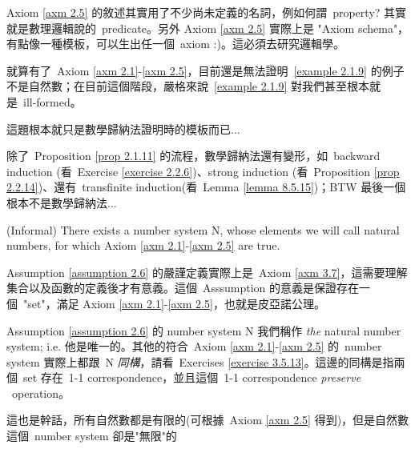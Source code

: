 \begin{remark}\label{rmk 2.1.10} Axiom \ref{axm 2.5} 的敘述其實用了不少尚未定義的名詞，例如何謂\ property? 其實就是數理邏輯說的\ predicate。另外 Axiom \ref{axm 2.5} 實際上是 "Axiom schema"，有點像一種模板，可以生出任一個\  axiom :)。這必須去研究邏輯學。
\end{remark}

\begin{note}
就算有了\ Axiom \ref{axm 2.1}-\ref{axm 2.5}，目前還是無法證明\  \ref{example 2.1.9} 的例子不是自然數；在目前這個階段，嚴格來說\ \ref{example 2.1.9} 對我們甚至根本就是\ ill-formed。
\end{note}

\begin{proposition}\label{prop 2.1.11}
這題根本就只是數學歸納法證明時的模板而已...
\end{proposition}

\begin{note}
除了\ Proposition \ref{prop 2.1.11} 的流程，數學歸納法還有變形，如\ backward induction (看\ Exercise \ref{exercise 2.2.6})、strong induction (看\ Proposition \ref{prop 2.2.14})、還有\ transfinite induction(看\ Lemma \ref{lemma 8.5.15})；BTW 最後一個根本不是數學歸納法...
\end{note}

\begin{assumption}\label{assumption 2.6} (Informal)
There exists a number system N, whose elements we will call natural numbers, for which Axiom \ref{axm 2.1}-\ref{axm 2.5} are true.
\end{assumption}
\begin{note}
Assumption \ref{assumption 2.6} 的嚴謹定義實際上是\ Axiom \ref{axm 3.7}，這需要理解集合以及函數的定義後才有意義。這個\ Asssumption 的意義是保證存在一個\ "set"，滿足 Axiom \ref{axm 2.1}-\ref{axm 2.5}，也就是皮亞諾公理。
\end{note}

\begin{remark}\label{remark 2.1.12} Assumption \ref{assumption 2.6} 的 number system N 我們稱作 \emph{the} natural number system; i.e. 他是唯一的。其他的符合\ Axiom \ref{axm 2.1}-\ref{axm 2.5} 的\ number system 實際上都跟\ N \emph{同構}，請看\ Exercises \ref{exercise 3.5.13}。這邊的同構是指兩個\ set 存在\ 1-1 correspondence，並且這個\ 1-1 correspondence \emph{preserve} \INC\ operation。
\end{remark}

\begin{remark}\label{remark 2.1.13}
這也是幹話，所有自然數都是有限的(可根據\ Axiom \ref{axm 2.5} 得到)，但是自然數這個\ number system 卻是"無限"的
\end{remark}

